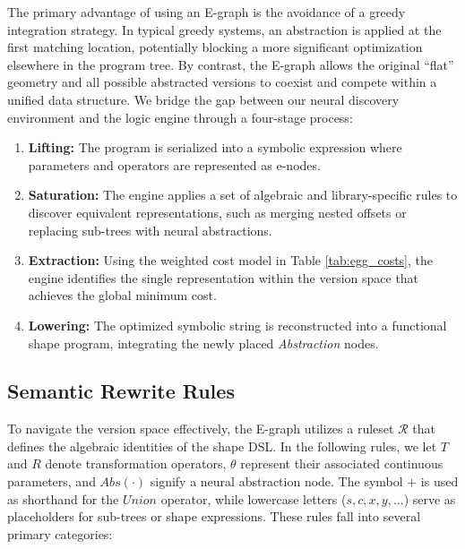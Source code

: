 \documentclass{thesis}
\begin{document}
The primary advantage of using an E-graph is the avoidance of a greedy integration strategy. In typical greedy systems, an abstraction is applied at the first matching location, potentially blocking a more significant optimization elsewhere in the program tree. By contrast, the E-graph allows the original ``flat'' geometry and all possible abstracted versions to coexist and compete within a unified data structure. We bridge the gap between our neural discovery environment and the logic engine through a four-stage process:
\begin{enumerate}
    \item \textbf{Lifting:} The program is serialized into a symbolic expression where parameters and operators are represented as e-nodes.
    \item \textbf{Saturation:} The engine applies a set of algebraic and library-specific rules to discover equivalent representations, such as merging nested offsets or replacing sub-trees with neural abstractions.
    \item \textbf{Extraction:} Using the weighted cost model in Table \ref{tab:egg_costs}, the engine identifies the single representation within the version space that achieves the global minimum cost.
    \item \textbf{Lowering:} The optimized symbolic string is reconstructed into a functional shape program, integrating the newly placed \textit{Abstraction} nodes.
\end{enumerate}

\subsection{Semantic Rewrite Rules}

To navigate the version space effectively, the E-graph utilizes a ruleset $\mathcal{R}$ that defines the algebraic identities of the shape DSL. In the following rules, we let $T$ and $R$ denote transformation operators, $\theta$ represent their associated continuous parameters, and $Abs(\cdot)$ signify a neural abstraction node. The symbol $+$ is used as shorthand for the $Union$ operator, while lowercase letters ($s, c, x, y, \dots$) serve as placeholders for sub-trees or shape expressions. These rules fall into several primary categories:
\end{document}
